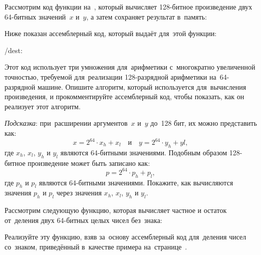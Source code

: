 \begin{exercise}
\item Рассмотрим код функции на~, который вычисляет 128-битное произведение двух 64-битных значений~$x$ и~$y$, а затем сохраняет результат в~память:


Ниже показан ассемблерный код, который \GCC{} выдаёт для~этой функции:

\precomment/dest: %
\vspace{-0.6\baselineskip}

Этот код использует три умножения для~арифметики с~многократно увеличенной точностью, требуемой для~реализации 128-разрядной арифметики на~64-разрядной машине. Опишите алгоритм, который используется для~вычисления произведения, и прокомментируйте ассемблерный код, чтобы показать, как он реализует этот алгоритм.

\smallskip
\emph{Подсказка}: при~расширении аргументов~\(x\) и~\(y\) до~128 бит, их можно представить как:
\[
  x = 2^{64}\cdot x_h + x_l\quad \text{и}\quad y = 2^{64}\cdot y_h + yl,
\]
где \(x_h\), \(x_l\), \(y_h\) и \(y_l\) являются 64-битными значениями. Подобным образом 128-битное произведение может быть записано как:
\[
  p = 2^{64}\cdot p_h + p_l,
\]
где \(p_h\) и \(p_l\) являются 64-битными значениями. Покажите, как вычисляются значения \(p_h\) и \(p_l\) через значения \(x_h\), \(x_l\), \(y_h\) и \(y_l\).


\item Рассмотрим следующую функцию, которая вычисляет частное и остаток от~деления двух 64-битных целых чисел без~знака:


Реализуйте эту функцию, взяв за~основу ассемблерный код для~деления чисел со~знаком, приведённый в~качестве примера на~странице~\pageref{example:asm:remdiv}.

\end{exercise}
